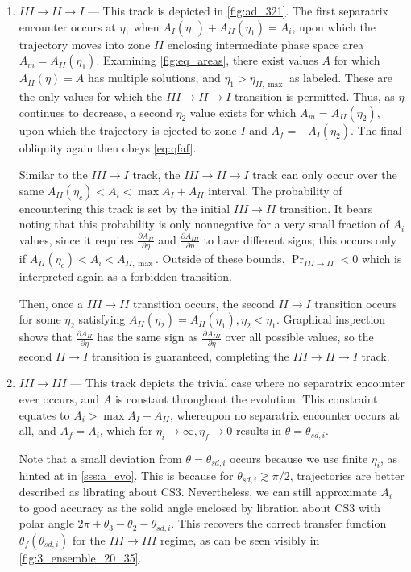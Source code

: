 \documentclass[
        fleqn,
        usenatbib,
        referee,
    ]{mnras}
\newcommand*{\pd}[2]{\frac{\partial#1}{\partial#2}}
\newcommand*{\p}[1]{\left(#1\right)}
\begin{document}
\begin{enumerate}
    \item $III \to II \to I$ --- This track is depicted in \autoref{fig:ad_321}.
        The first separatrix encounter occurs at $\eta_1$ when $A_I(\eta_1) +
        A_{II}(\eta_1) = A_i$, upon which the trajectory moves into zone $II$
        enclosing intermediate phase space area $A_m = A_{II}(\eta_1)$.
        Examining \autoref{fig:eq_areas}, there exist values $A$ for which
        $A_{II}(\eta) = A$ has multiple solutions, and $\eta_1 > \eta_{II,
        \max}$ as labeled. These are the only values for which the $III \to II
        \to I$ transition is permitted. Thus, as $\eta$ continues to decrease, a
        second $\eta_2$ value exists for which $A_m = A_{II}(\eta_2)$, upon
        which the trajectory is ejected to zone $I$ and $A_f = -A_I(\eta_2)$.
        The final obliquity again then obeys \autoref{eq:qfaf}.

        Similar to the $III \to I$ track, the $III \to II \to I$ track can only
        occur over the same $A_{II}(\eta_c) < A_i < \max A_I + A_{II}$ interval.
        The probability of encountering this track is set by the initial $III
        \to II$ transition. It bears noting that this probability is only
        nonnegative for a very small fraction of $A_i$ values, since it requires
        $\pd{A_{II}}{\eta}$ and $\pd{A_{III}}{\eta}$ to have different signs;
        this occurs only if $A_{II}\p{\eta_c} < A_i < A_{II, \max}$. Outside of
        these bounds, $\Pr_{III \to II} < 0$ which is interpreted again as a
        forbidden transition.

        Then, once a $III \to II$ transition occurs, the second $II \to I$
        transition occurs for some $\eta_2$ satisfying $A_{II}(\eta_2) =
        A_{II}(\eta_1), \eta_2 < \eta_1$. Graphical inspection shows that
        $\pd{A_{II}}{\eta}$ has the same sign as $\pd{A_{III}}{\eta}$ over all
        possible values, so the second $II \to I$ transition is guaranteed,
        completing the $III \to II \to I$ track.

    \item $III \to III$ --- This track depicts the trivial case where no
        separatrix encounter ever occurs, and $A$ is constant throughout the
        evolution. This constraint equates to $A_i > \max A_I + A_{II}$,
        whereupon no separatrix encounter occurs at all, and $A_f = A_i$, which
        for $\eta_i \to \infty, \eta_f \to 0$ results in $\theta = \theta_{sd,
        i}$.

        Note that a small deviation from $\theta = \theta_{sd, i}$ occurs
        because we use finite $\eta_i$, as hinted at in \autoref{sss:a_evo}.
        This is because for $\theta_{sd, i} \gtrsim \pi/2$, trajectories are
        better described as librating about CS3. Nevertheless, we can still
        approximate $A_i$ to good accuracy as the solid angle enclosed by
        libration about CS3 with polar angle $2\pi + \theta_3 - \theta_2 -
        \theta_{sd, i}$. This recovers the correct transfer function
        $\theta_f\p{\theta_{sd, i}}$ for the $III \to III$ regime, as can be
        seen visibly in \autoref{fig:3_ensemble_20_35}.
\end{enumerate}
\end{document}
